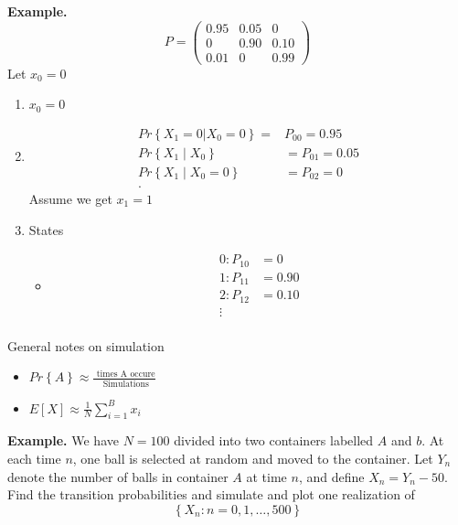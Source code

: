 \documentclass{article}
\theoremstyle{remark}
\begin{document}
 \begin{tcolorbox}
   \textbf{Example.} 
   \[
   P = \begin{pmatrix}
   0.95  &  0.05  &  0 \\
   0  &  0.90  &  0.10 \\
   0.01  &  0  &  0.99
   \end{pmatrix} 
   \] 
   Let $x_{0} = 0$
   \begin{enumerate}
     \item $x_{0} = 0$  
     \item 
       \begin{align*}
       Pr \left \{ X_{1} = 0 | X_{0} = 0 \right \} = &  P_{00} = 0.95  \\
       Pr \left \{ X_{1}  \mid  X_{0}  \right \}  &=  P_{01} = 0.05 \\
       Pr \left \{ X_{1}  \mid  X_{0} = 0 \right \}  &=  P_{02} = 0 \\
       .\end{align*}
       Assume we get $x_{1} = 1$
     \item States 
       \begin{itemize}
         \item \[
             \begin{split}
         0: P_{10}  &=  0 \\
         1: P_{11 } &=  0.90 \\
         2: P_{12} &=  0.10 \\
         \vdots  \\
             \end{split} 
         \] 
       \end{itemize}
   \end{enumerate}
 \end{tcolorbox}

 \begin{tcolorbox}
   General notes on simulation 
   \begin{itemize}
     \item
   $Pr \left \{ A  \right \} \approx \frac{\text{ times A occure}}{ \text{ Simulations}}  $
 \item $E\left[ X \right] \approx \frac{1}{N}  \sum_{i=1}^{B}  x_{i}$
   \end{itemize}
 \end{tcolorbox}

   \textbf{Example.} We have $N=100$ divided into two containers labelled $A$ and $ b$. At each time $n$, one ball is selected at random and moved to the container. Let $Y_{n}$ denote the number of balls in container $A$ at time $n$, and define $X_{n} = Y_{n} -50$. Find the transition probabilities and simulate and plot one realization of \[
   \left\{ X_{n}: n  = 0,1, \ldots, 500 \right\}
   \] 
\end{document}
